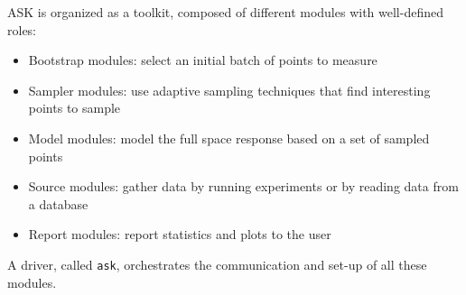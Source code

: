 ASK is organized as a toolkit, composed of different modules with well-defined roles:

\begin{itemize}
	\item Bootstrap modules: select an initial batch of points to measure
\end{itemize}

\begin{itemize}
	\item Sampler modules: use adaptive sampling techniques that find interesting points to sample
\end{itemize}

\begin{itemize}
	\item Model modules: model the full space response based on a set of sampled points
\end{itemize}

\begin{itemize}
	\item Source modules: gather data by running experiments or by reading data from a database
\end{itemize}

\begin{itemize}
	\item Report modules: report statistics and plots to the user
\end{itemize}

A driver, called \texttt{ask}, orchestrates the communication and set-up of all these modules.

